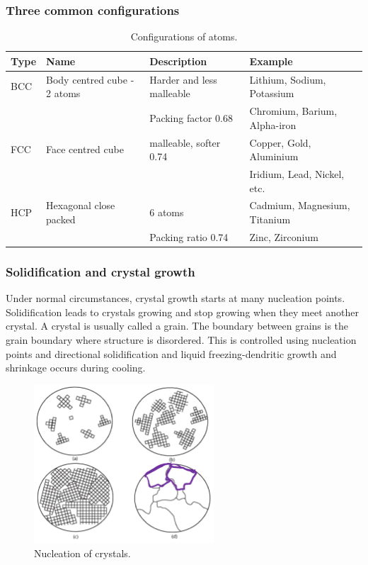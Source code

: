 \subsubsection{Three common configurations}
\begin{table}[H]
	\centering
	\begin{tabular}{@{}llll@{}}
		\toprule
		\textbf{Type} & \textbf{Name}               & \textbf{Description}      & \textbf{Example}             \\
		\midrule
		BCC           & Body centred cube - 2 atoms & Harder and less malleable & Lithium, Sodium, Potassium   \\
		              &                             & Packing factor 0.68       & Chromium, Barium, Alpha-iron \\
		FCC           & Face centred cube           & malleable, softer 0.74    & Copper, Gold, Aluminium      \\
		              &                             &                           & Iridium, Lead, Nickel, etc.  \\
		HCP           & Hexagonal close packed      & 6 atoms                   & Cadmium, Magnesium, Titanium \\
		              &                             & Packing ratio 0.74        & Zinc, Zirconium              \\
		\bottomrule
	\end{tabular}
	\caption{Configurations of atoms.}
\end{table}
\subsubsection{Solidification and crystal growth}
Under normal circumstances, crystal growth starts at many nucleation points. Solidification leads to crystals growing and stop growing when they meet another crystal. A crystal is usually called a grain. The boundary between grains is the grain boundary where structure is disordered. This is controlled using nucleation points and directional solidification and liquid freezing-dendritic growth and shrinkage occurs during cooling.
\begin{figure}[H]
	\centering
	\includegraphics[width = 0.6\textwidth]{./img/figure14.png}
	\caption{Nucleation of crystals.}
\end{figure}
